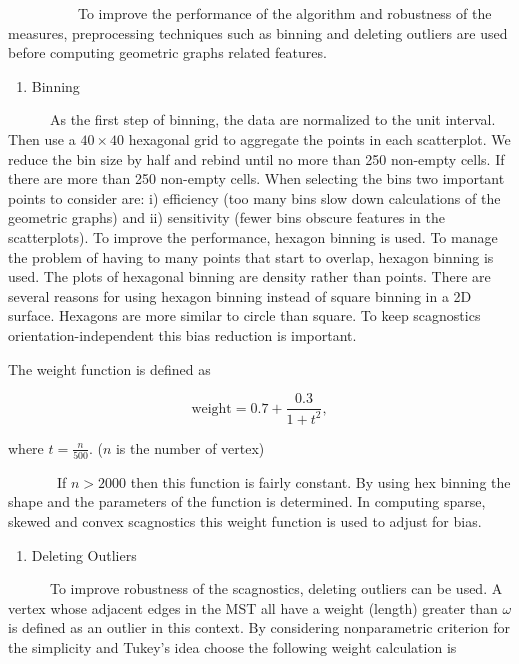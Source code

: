 \documentclass{article}
\begin{document}
~~~~~~~~~~To improve the performance of the algorithm and robustness of
the measures, preprocessing techniques such as binning and deleting
outliers are used before computing geometric graphs related features.

\begin{enumerate}
\def\labelenumi{\roman{enumi})}
\tightlist
\item
  Binning
\end{enumerate}

~~~~~~As the first step of binning, the data are normalized to the unit
interval. Then use a \(40 \times 40\) hexagonal grid to aggregate the
points in each scatterplot. We reduce the bin size by half and rebind
until no more than 250 non-empty cells. If there are more than 250
non-empty cells. When selecting the bins two important points to
consider are: i) efficiency (too many bins slow down calculations of the
geometric graphs) and ii) sensitivity (fewer bins obscure features in
the scatterplots). To improve the performance, hexagon binning is used.
To manage the problem of having to many points that start to overlap,
hexagon binning is used. The plots of hexagonal binning are density
rather than points. There are several reasons for using hexagon binning
instead of square binning in a 2D surface. Hexagons are more similar to
circle than square. To keep scagnostics orientation-independent this
bias reduction is important.

The weight function is defined as

\begin{equation}
    \text{weight} = 0.7 + \frac{0.3}{1 + t^2},
    \label{w2}
\end{equation}

where \(t=\frac{n}{500}\). (\(n\) is the number of vertex)

~~~~~~~If \(n > 2000\) then this function is fairly constant. By using
hex binning the shape and the parameters of the function is determined.
In computing sparse, skewed and convex scagnostics this weight function
is used to adjust for bias.

\begin{enumerate}
\def\labelenumi{\roman{enumi})}
\setcounter{enumi}{1}
\tightlist
\item
  Deleting Outliers
\end{enumerate}

~~~~~~To improve robustness of the scagnostics, deleting outliers can be
used. A vertex whose adjacent edges in the MST all have a weight
(length) greater than \(\omega\) is defined as an outlier in this
context. By considering nonparametric criterion for the simplicity and
Tukey's idea choose the following weight calculation is
\end{document}
